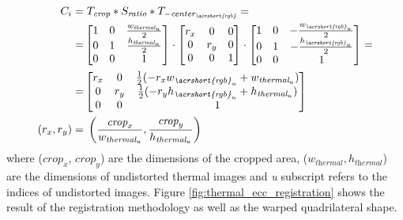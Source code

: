 \begin{gather}
    \label{eq:cropping_composite_matrix}
    \begin{aligned}
        C_{i} = & \hspace{1mm} T_{\textit{crop}} * S_{\textit{ratio}} * T_{-\textit{center}_{\textit{\acrshort{rgb}}}} =\\
           = &\begin{bmatrix}
                        1 & 0 & \frac{w_{\textit{thermal}_u}}{2}\\
                        0 & 1 & \frac{h_{\textit{thermal}_u}}{2}\\
                        0 & 0 & 1
                    \end{bmatrix} \cdot 
                    \begin{bmatrix}
                        r_x & 0 & 0\\
                        0 & r_y & 0\\
                        0 & 0 & 1
                    \end{bmatrix} \cdot
                    \begin{bmatrix}
                        1 & 0 & -\frac{w_{\textit{\acrshort{rgb}}_u}}{2}\\
                        0 & 1 & -\frac{h_{\textit{\acrshort{rgb}}_u}}{2}\\
                        0 & 0 & 1
                    \end{bmatrix} =\\
                    = &\begin{bmatrix}
                        r_x & 0 & \frac{1}{2}(-r_{x} w_{\textit{\acrshort{rgb}}_u} + w_{\textit{thermal}_u})\\
                        0 & r_y & \frac{1}{2}(-r_{y} h_{\textit{\acrshort{rgb}}_u} + h_{\textit{thermal}_u})\\
                        0 & 0 & 1
                    \end{bmatrix}\\
        (r_x, r_y) = & \hspace{1mm} \left(\frac{\textit{crop}_x}{w_{\textit{thermal}_u}}, \frac{\textit{crop}_y}{h_{\textit{thermal}_u}}\right)
    \end{aligned}
\end{gather}
where ($\textit{crop}_x$, $\textit{crop}_y$) are the dimensions of the cropped area, ($w_{\textit{thermal}}, h_{\textit{thermal}}$) are the dimensions of undistorted thermal images and \textit{u} subscript refers to the indices of undistorted images. Figure \ref{fig:thermal_ecc_registration} shows the result of the registration methodology as well as the warped quadrilateral shape.

